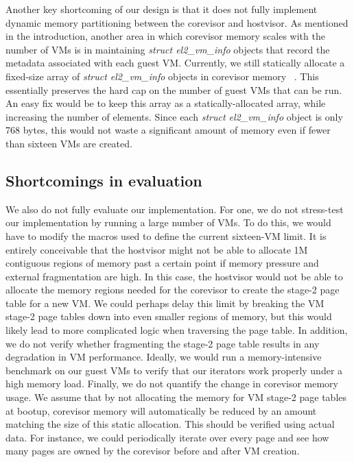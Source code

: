 Another key shortcoming of our design is that it does not fully implement
dynamic memory partitioning between the corevisor and hostvisor. As mentioned in
the introduction, another area in which corevisor memory scales with the number
of VMs is in maintaining \textit{struct el2\_vm\_info} objects that record the
metadata associated with each guest VM. Currently, we still statically allocate
a fixed-size array of \textit{struct el2\_vm\_info} objects in corevisor
memory ~\cite{hypsec_host.h}. This essentially preserves the hard cap on the
number of guest VMs that can be run. An easy fix would be to keep this array
as a statically-allocated array, while increasing the number of elements. Since each
\textit{struct el2\_vm\_info} object is only 768 bytes, this would not waste a
significant amount of memory even if fewer than sixteen VMs are created.

\subsection{Shortcomings in evaluation}

We also do not fully evaluate our implementation. For one, we do not stress-test our implementation by running a large number
of VMs. To do this, we would have to modify the macros used to define the current
sixteen-VM limit. It is entirely conceivable that the hostvisor might not be able
to allocate 1M contiguous regions of memory past a certain point if memory
pressure and external fragmentation are high. In this case, the hostvisor would
not be able to allocate the memory regions needed for the corevisor to create
the stage-2 page table for a new VM. We could perhaps delay this limit by breaking
the VM stage-2 page tables down into even smaller regions of memory, but this would
likely lead to more complicated logic when traversing the page table. In addition, we do not verify whether fragmenting the stage-2 page table results
in any degradation in VM performance. Ideally, we would run a memory-intensive
benchmark on our guest VMs to verify that our iterators work properly under a
high memory load. Finally, we do not quantify the change in corevisor memory usage.
We assume that by not allocating the memory for VM stage-2 page tables at bootup,
corevisor memory will automatically be reduced by an amount matching the
size of this static allocation. This should be verified using actual data. For
instance, we could periodically iterate over every page and see how many pages
are owned by the corevisor before and after VM creation.

